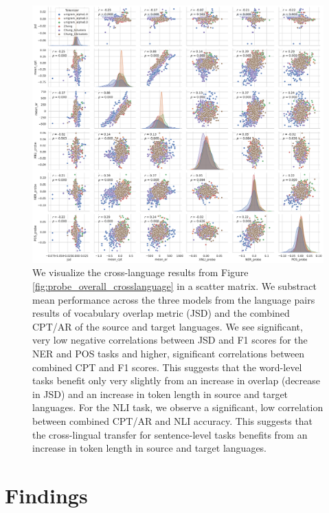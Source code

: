 \begin{figure}
    \centering
    \includegraphics[width=\textwidth]{figures/probe_detailed_crosslanguage_scattermatrix.pdf}
    \caption{We visualize the cross-language results from Figure \ref{fig:probe_overall_crosslanguage} in a scatter matrix. We substract mean performance across the three models from the language pairs results of vocabulary overlap metric (JSD) and the combined CPT/AR of the source and target languages. We see significant, very low negative correlations between JSD and F1 scores for the NER and POS tasks and higher, significant correlations between combined CPT and F1 scores. This suggests that the word-level tasks benefit only very slightly from an increase in overlap (decrease in JSD) and an increase in token length in source and target languages. For the NLI task, we observe a significant, low correlation between combined CPT/AR and NLI accuracy. This suggests that the cross-lingual transfer for sentence-level tasks benefits from an increase in token length in source and target languages.}
    \label{fig:probe_overall_crosslanguage_scattermatrix}
\end{figure}

\section{Findings}


